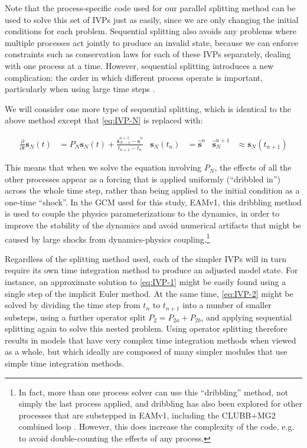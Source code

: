 \documentclass [11pt, proquest] {uwthesis}[2020/02/24]
\begin{document}
Note that the process-specific code used for our parallel splitting method can be used to solve this set of IVPs just as easily, since we are only changing the initial conditions for each problem. Sequential splitting also avoids any problems where multiple processes act jointly to produce an invalid state, because we can enforce constraints such as conservation laws for each of these IVPs separately, dealing with one process at a time. However, sequential splitting introduces a new complication: the order in which different process operate is important, particularly when using large time steps \parencite{Beljaars2004,Donahue2018}.

We will consider one more type of sequential splitting, which is identical to the above method except that \eqref{eq:IVP-N} is replaced with:

\begin{align}
    \frac{\partial}{\partial t} \mathbf{s}_N(t) &= P_N \mathbf{s}_N(t) + \frac{\hat{\mathbf{s}}_{N-1}^{n+1} - \hat{\mathbf{s}}^n}{t_{n+1} - t_n} & \mathbf{s}_N(t_n) &= \hat{\mathbf{s}}^n & \hat{\mathbf{s}}^{n+1}_N &\approx \mathbf{s}_N(t_{n+1})
\end{align}

This means that when we solve the equation involving $P_N$, the effects of all the other processes appear as a forcing that is applied uniformly (``dribbled in'') across the whole time step, rather than being applied to the initial condition as a one-time ``shock''. In the GCM used for this study, EAMv1, this dribbling method is used to couple the physics parameterizations to the dynamics, in order to improve the stability of the dynamics and avoid numerical artifacts that might be caused by large shocks from dynamics-physics coupling.\footnote{In fact, more than one process solver can use this ``dribbling'' method, not simply the last process applied, and dribbling has also been explored for other processes that are substepped in EAMv1, including the CLUBB+MG2 combined loop \parencite{Wan2020}. However, this does increase the complexity of the code, e.g. to avoid double-counting the effects of any process.}

Regardless of the splitting method used, each of the simpler IVPs will in turn require its own time integration method to produce an adjusted model state. For instance, an approximate solution to \eqref{eq:IVP-1} might be easily found using a single step of the implicit Euler method. At the same time, \eqref{eq:IVP-2} might be solved by dividing the time step from $t_n$ to $t_{n+1}$ into a number of smaller substeps, using a further operator split $P_2 = P_{2a} + P_{2b}$, and applying sequential splitting again to solve this nested problem. Using operator splitting therefore results in models that have very complex time integration methods when viewed as a whole, but which ideally are composed of many simpler modules that use simple time integration methods.
\end{document}
